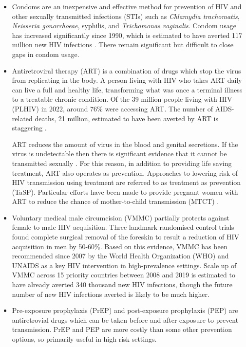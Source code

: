 \documentclass[a4paper, nobind]{templates/ociamthesis}
\begin{document}
\begin{itemize}
\item
  Condoms are an inexpensive and effective method for prevention of HIV and other sexually transmitted infections (STIs) such as \emph{Chlamydia trachomatis}, \emph{Neisseria gonorrhoeae}, syphilis, and \emph{Trichomonas vaginalis}.
  Condom usage has increased significantly since 1990, which is estimated to have averted 117 million new HIV infections \autocite{stover2021impact}.
  There remain significant but difficult to close gaps in condom usage.
\item
  Antiretroviral therapy (ART) is a combination of drugs which stop the virus from replicating in the body.
  A person living with HIV who takes ART daily can live a full and healthy life, transforming what was once a terminal illness to a treatable chronic condition.
  Of the 39 million people living with HIV (PLHIV) in 2022, around 76\% were accessing ART.
  The number of AIDS-related deaths, 21 million, estimated to have been averted by ART is staggering \autocite{unaids2023global}.

  ART reduces the amount of virus in the blood and genital secretions.
  If the virus is undetectable then there is significant evidence that it cannot be transmitted sexually \autocite{cohen2011prevention,broyles2023risk}.
  For this reason, in addition to providing life saving treatment, ART also operates as prevention.
  Approaches to lowering risk of HIV transmission using treatment are referred to as treatment as prevention (TaSP).
  Particular efforts have been made to provide pregnant women with ART to reduce the chance of mother-to-child transmission (MTCT) \autocite{siegfried2011antiretrovirals}.
\item
  Voluntary medical male circumcision (VMMC) partially protects against female-to-male HIV acquisition.
  Three landmark randomised control trials \autocite{auvert2005randomized,gray2007male,bailey2007male} found complete surgical removal of the foreskin to result a reduction of HIV acquisition in men by 50-60\%.
  Based on this evidence, VMMC has been recommended since 2007 by the World Health Organization (WHO) and UNAIDS as a key HIV intervention in high-prevalence settings.
  Scale up of VMMC across 15 priority countries between 2008 and 2019 is estimated to have already averted 340 thousand new HIV infections, though the future number of new HIV infections averted is likely to be much higher.
\item
  Pre-exposure prophylaxis (PrEP) and post-exposure prophylaxis (PEP) are antiretrovial drugs which can be taken before and after exposure to prevent transmission.
  PrEP and PEP are more costly than some other prevention options, so primarily useful in high risk settings.
\end{itemize}
\end{document}
